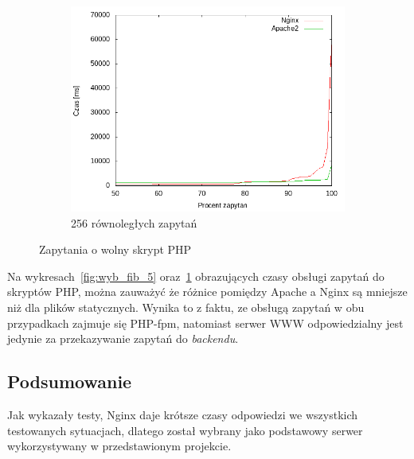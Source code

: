 \begin{figure}
\begin{subfigure}[h]{0.3\textwidth}
		\includegraphics[width=\textwidth]{testy/wybor_fib_15_256.png}
		\caption{256 równoległych zapytań}
	\end{subfigure}
	\caption{Zapytania o wolny skrypt PHP}\label{fig:wyb_fib_15}
\end{figure}
Na wykresach~\ref{fig:wyb_fib_5} oraz~\ref{fig:wyb_fib_15} obrazujących czasy obsługi zapytań do skryptów PHP, można zauważyć że różnice pomiędzy Apache a Nginx są mniejsze niż dla plików statycznych.
Wynika to z faktu, ze obsługą zapytań w obu przypadkach zajmuje się PHP-fpm, natomiast serwer WWW odpowiedzialny jest jedynie za przekazywanie zapytań do \textit{backendu}.
\subsection{Podsumowanie}
Jak wykazały testy, Nginx daje krótsze czasy odpowiedzi we wszystkich testowanych sytuacjach, dlatego został wybrany jako podstawowy serwer wykorzystywany w przedstawionym projekcie.
